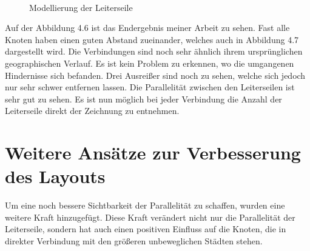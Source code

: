 \begin{figure}[t]
	\centering
	\hspace{1.0cm}%
	\\
	\caption[Vergleich der Leiterseile]{Modellierung der Leiterseile}
	\label{fig_testbild2}
\end{figure}


Auf der Abbildung 4.6 ist das Endergebnis  meiner Arbeit zu sehen. Fast alle Knoten haben einen guten Abstand zueinander, welches auch in Abbildung 4.7 dargestellt wird.  Die Verbindungen sind noch sehr ähnlich ihrem ursprünglichen geographischen Verlauf. Es ist kein Problem zu erkennen, wo die umgangenen Hindernisse sich befanden. Drei Ausreißer sind noch zu sehen, welche sich jedoch nur sehr schwer entfernen lassen. Die Parallelität zwischen den Leiterseilen ist sehr gut zu sehen. Es ist nun möglich bei jeder Verbindung die Anzahl der Leiterseile direkt der Zeichnung zu entnehmen.

\section{Weitere Ansätze zur Verbesserung des Layouts}
\label{Kapitel_4_-_Unterkapitel_4}

Um eine noch bessere Sichtbarkeit der Parallelität zu schaffen, wurden eine weitere Kraft hinzugefügt. Diese Kraft verändert nicht nur die Parallelität der Leiterseile, sondern hat auch einen positiven Einfluss auf die Knoten, die in direkter Verbindung mit den größeren unbeweglichen Städten stehen.
